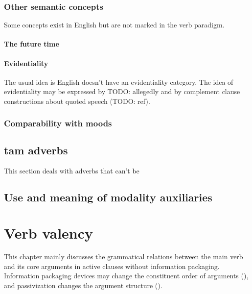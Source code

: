 \documentclass[UTF8, a4paper, oneside, scheme=plain]{ctexrep}
\begin{document}
\subsection{Other semantic concepts}

Some concepts exist in English but are not marked in the verb paradigm.

\subsubsection{The future time}\label{sec:future}

\subsubsection{Evidentiality}

The usual idea is English doesn't have an evidentiality category.
The idea of evidentiality may be expressed by TODO: allegedly 
and by complement clause constructions about quoted speech (TODO: ref).

\subsection{Comparability with moods}\label{sec:tam-mood-compatibility}

\section{\acs{tam} adverbs}\label{sec:tam.adverbs}

This section deals with adverbs that can't be 

\section{Use and meaning of modality auxiliaries}\label{sec:verb-inflection.modal-use}


\chapter{Verb valency}

This chapter mainly discusses the grammatical relations between the main verb and its core arguments 
in active clauses without information packaging.
Information packaging devices may change the constituent order of arguments 
(),
and passivization changes the argument structure (). 
\end{document}

